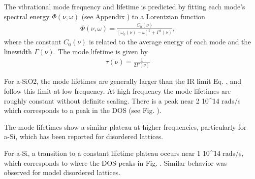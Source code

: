 \documentclass[aps,prb,twocolumn,superscriptaddress,footinbib,amsmath,amssymb,floatfix]{revtex4}
\begin{document}
The vibrational mode frequency and lifetime is predicted by fitting each mode's 
spectral energy $\Phi(\nu,\omega)$ (see Appendix ) to a Lorentzian function
\begin{equation}\label{EQ:Lorentzian_NMD}
\begin{split}
\Phi(\nu,\omega) = 
\frac{C_0(\nu)}{[\omega_0(\nu)-\omega]^2+\Gamma^2(\nu)},
\end{split}
\end{equation}
where the constant $C_0(\nu)$ is related to the average energy of 
each mode and the linewidth $\Gamma(\nu)$.
\cite{larkin_comparison_2012} The mode lifetime is given by
\begin{equation}\label{EQ:NMD_life}
\begin{split}
\tau(\nu) = \frac{1}{2\Gamma(\nu)}
\end{split}
\end{equation}

For a-SiO2, the mode lifetimes are generally larger than the 
IR limit Eq. , and follow this limit at low frequency. 
At high frequency the mode lifetimes are roughly constant 
without definite scaling. There is a peak near 
2 10^{14} rads/s which corresponds to a peak in the DOS (see Fig. ).  

The mode lifetimes show a similar 
plateau at higher frequencies, particularly for a-Si, which has been 
reported for disordered lattices.\cite{larkin_predicting_2013}

For a-Si, a transition to a constant lifetime plateau occurs near 
1 10^{14} rads/s, which corresponds to where the DOS peaks in Fig. . 
Similar behavior was observed for model disordered lattices.
\cite{he_heat_2011,larkin_predicting_2013} 




\end{document}

